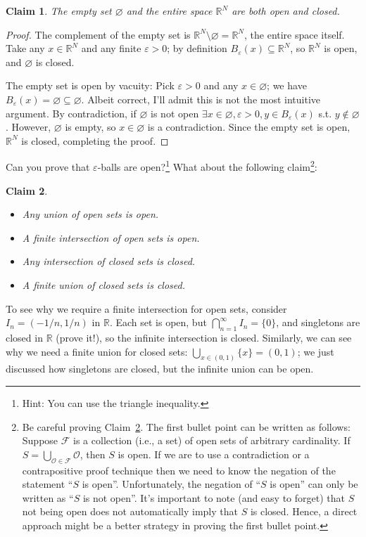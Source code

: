 \documentclass{article}
\newcommand{\R}{\mathbb{R}}
\newtheorem{claim}{Claim}
\theoremstyle{definition}
\begin{document}
\begin{claim}
  The empty set $\varnothing$ and the entire space $\mathbb{R}^N$ are both open and closed.
\end{claim}

\begin{proof}
  The complement of  the empty set is $\R^N \setminus \varnothing = \R^N$, the entire space itself. Take any $x \in \R^N$ and any finite $\varepsilon > 0$; by definition $B_{\varepsilon}(x) \subseteq \R^N$, so $\R^N$ is open, and $\varnothing$ is closed.

  The empty set is open by vacuity: Pick $\varepsilon > 0$ and any $x \in \varnothing$; we have $B_{\varepsilon}(x) = \varnothing \subseteq \varnothing$. Albeit correct, I'll admit this is not  the most intuitive argument. By contradiction, if $\varnothing$ is not open $\exists x \in \varnothing, \varepsilon > 0, y \in B_{\varepsilon}(x)$ s.t. $y \notin \varnothing$. However, $\varnothing$ is empty, so $x \in \varnothing$ is a contradiction. Since the empty set is open, $\mathbb{R}^N$ is closed, completing the proof.
\end{proof}

Can you prove that $\varepsilon$-balls are open?\footnote{Hint: You can use the triangle inequality.} What about the following claim\footnote{Be careful proving Claim~\ref{claim:props_open_closed_sets}. The first bullet point can be written as follows: Suppose $\mathcal{F}$ is a collection (i.e., a set) of open sets of arbitrary cardinality. If $S = \bigcup_{\mathcal{O}\in \mathcal{F}} \mathcal{O}$, then $S$ is open. If we are to use a contradiction or a contrapositive proof technique then we need to know the negation of the statement ``$S$ is open''. Unfortunately, the negation of ``$S$ is open'' can only be written as ``$S$ is not open''. It's important to note (and easy to forget) that $S$ not being open does not automatically imply that $S$ is closed. Hence, a direct approach might be a better strategy in proving the first bullet point.}: 

\begin{claim}\label{claim:props_open_closed_sets}
  \begin{itemize}
    \item Any union of open sets is open.

    \item A finite intersection of open sets is open.

    \item Any intersection of closed sets is closed.

    \item A finite union of closed sets is closed.
  \end{itemize}
\end{claim}
To see why we require a finite intersection for open sets, consider $I_n = (-1/n, 1/n)$ in $\R$. Each set is open, but $\bigcap^{\infty}_{n = 1} I_n = \{0\}$, and singletons are closed in $\R$ (prove it!), so the infinite intersection is closed. Similarly, we can see why we need a finite union for closed sets: $\bigcup_{x \in (0, 1)} \{x\} = (0, 1)$; we just discussed how singletons are closed, but the infinite union can be open.
\end{document}

